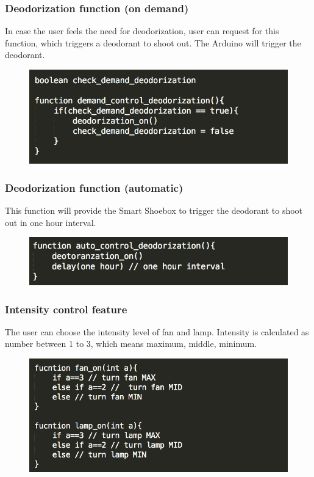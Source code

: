 \documentclass[conference]{IEEEtran}
\begin{document}
\subsubsection{Deodorization function (on demand)}
In case the user feels the need for deodorization, user can request for this function, which triggers a deodorant to shoot out. The Arduino will trigger the deodorant.
\begin{figure}[htbp]
\begin{center}
    \includegraphics[scale=0.6]{optimization4}
    \label{fig:label}
\end{center}
\end{figure}
\subsubsection{Deodorization function (automatic)}
This function will provide the Smart Shoebox to trigger the deodorant to shoot out in one hour interval. 
\begin{figure}[htbp]
\begin{center}
    \includegraphics[scale=0.6]{optimization5}
    \label{fig:label}
\end{center}
\end{figure}
\subsubsection{Intensity control feature}
The user can choose the intensity level of fan and lamp. Intensity is calculated as number between 1 to 3, which means maximum, middle, minimum.
\begin{figure}[htbp]
\begin{center}
    \includegraphics[scale=0.6]{optimization6}
    \label{fig:label}
\end{center}
\end{figure}
\\
\end{document}
